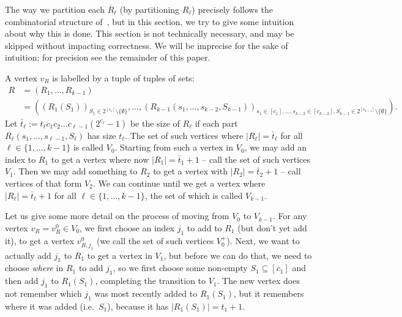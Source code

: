 \documentclass{theoretics}
\renewcommand{\>}{\rangle}
\newcommand{\<}{\langle}
\renewcommand{\(}{\left(}
\renewcommand{\)}{\right)}
\begin{document}
The way we partition each $\overline{R}_{\ell}$ (by partitioning $R_{\ell}$) precisely follows the combinatorial structure of~\cite{belovs2012kDist}, but in this section, we try to give some intuition about why this is done. This section is not technically necessary, and may be skipped without impacting correctness. We will be imprecise for the sake of intuition; for precision see the remainder of this paper. %

\noindent A vertex $v_R$ is labelled by a tuple of tuples of sets: 
\begin{align*}
{R}&=({R}_1,\dots,{R}_{k-1}) \\
&= \left(({R}_1(S_1))_{S_1\in 2^{[c_1]}\setminus\{\emptyset\}},\dots,({R}_{k-1}(s_1,\dots,s_{k-2},S_{k-1}))_{s_1\in [c_1],\dots,s_{k-2}\in [c_{k-2}],S_{k-1}\in 2^{[c_{k-1}]}\setminus\{\emptyset\}}\right).
\end{align*}
Let $\bar{t}_{\ell}:= t_{\ell} c_1c_2\dots c_{\ell-1}(2^{c_\ell}-1)$ be the size of $R_{\ell}$ if each part $R_{\ell}(s_1,\dots,s_{\ell-1},S_{\ell})$ has size $t_{\ell}$.
The set of such vertices where $|R_{\ell}|=\bar{t}_{\ell}$ for all $\ell\in\{1,\dots,k-1\}$ is called $V_0$. 
Starting from such a vertex in $V_0$, we may add an index to $R_1$ to get a vertex where now $|R_1|=\bar{t}_1+1$ -- call the set of such vertices $V_1$. Then we may add something to $R_2$ to get a vertex with $|R_2|=\bar{t}_2+1$ -- call vertices of that form $V_2$. We can continue until we get a vertex where $|R_{\ell}|=\bar{t}_{\ell}+1$ for all $\ell\in \{1,\dots,k-1\}$, the set of which is called $V_{k-1}$. 

Let us give some more detail on the process of moving from $V_0$ to $V_{k-1}$. For any vertex $v_R=v_R^0\in V_0$, we first choose an index $j_1$ to add to $R_1$ (but don't yet add it), to get a vertex $v_{R,j_{1}}^0$ (we call the set of such vertices $V_0^+$). Next, we want to actually add $j_1$ to $R_1$ to get a vertex in $V_1$, but before we can do that, we need to choose \emph{where} in $R_1$ to add $j_1$, so we first choose some non-empty $S_1\subseteq [c_1]$ and then add $j_1$ to $R_1(S_1)$, completing the transition to $V_1$. The new vertex does not remember which $j_1$ was most recently added to $R_1(S_1)$, but it remembers where it was added (i.e.~$S_1$), because it has $|R_1(S_1)|=t_1+1$.
\end{document}
